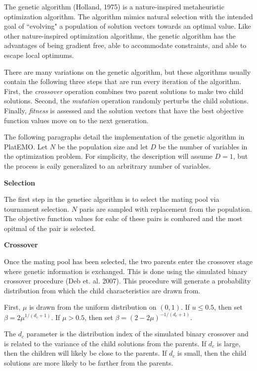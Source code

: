 \documentclass[11pt,a4paper]{article}
\begin{document}
The genetic algorithm (Holland, 1975) is a nature-inspired metaheuristic optimization algorithm. The algorithm mimics natural selection with the intended goal of ``evolving" a population of solution vectors towards an optimal value. Like other nature-inspired optimization algorithms, the genetic algorithm has the advantages of being gradient free, able to accommodate constraints, and able to escape local optimums. 

There are many variations on the genetic algorithm, but these algorithms usually contain the following three steps that are run every iteration of the algorithm. First, the \textit{crossover} operation combines two parent solutions to make two child solutions. Second, the \textit{mutation} operation randomly perturbs the child solutions. Finally, \textit{fitness} is assessed and the solution vectors that have the best objective function values move on to the next generation.

The following paragraphs detail the implementation of the genetic algorithm in PlatEMO. Let $N$ be the population size and let $D$ be the number of variables in the optimization problem. For simplicity, the description will assume $D=1$, but the process is eaily generalized to an arbritrary number of variables.

\begin{flushleft}
\textbf{Selection}
\end{flushleft}
The first step in the genetiec algorithm is to select the mating pool via tournament selection. $N$ paris are sampled with replacement from the population. The objective function values for eahc of these pairs is combared and the most opitmal of the pair is selected.

\begin{flushleft}
\textbf{Crossover}
\end{flushleft}
Once the mating pool has been selected, the two parents enter the crossover stage where genetic information is exchanged. This is done using the simulated binary crossover procedure (Deb et. al. 2007). This procedure will generate a probability distribution from which the child characteristics are drawn from.

First, $\mu$ is drawn from the uniform distribution on $(0,1)$. If $u \leq 0.5$, then set $\beta = 2\mu^{1/(d_c+1)}$. If $\mu > 0.5$, then set $\beta = (2-2\mu)^{-1/(d_c+1)}$. 

The $d_c$ parameter is the distribution index of the simulated binary crossover and is related to the variance of the child solutions from the parents. If $d_c$ is large, then the children will likely be close to the parents.  If $d_c$ is small, then the child solutions are more likely to be farther from the parents.
\end{document}
